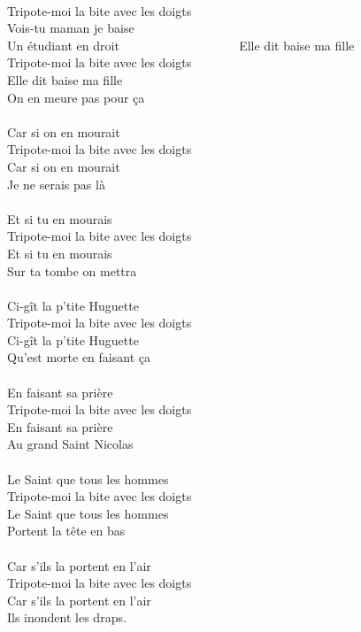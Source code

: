 \\Tripote-moi la bite avec les doigts
\\Vois-tu maman je baise
\\Un étudiant en droit ~~~~~~~~~~~~~~~~~~\bissimplemple
\breakpage
Elle dit baise ma fille
\\Tripote-moi la bite avec les doigts
\\Elle dit baise ma fille
\\On en meure pas pour ça ~~~~~~~~~~~~\bissimplemple
\\\\Car si on en mourait
\\Tripote-moi la bite avec les doigts
\\Car si on en mourait
\\Je ne serais pas là  ~~~~~~~~~~~~~~~~~~~~~~\bissimplemple
\\\\Et si tu en mourais
\\Tripote-moi la bite avec les doigts
\\Et si tu en mourais
\\Sur ta tombe on mettra  ~~~~~~~~~~~~~~\bissimplemple
\\\\Ci-gît la p'tite Huguette
\\Tripote-moi la bite avec les doigts
\\Ci-gît la p'tite Huguette
\\Qu'est morte en faisant ça  ~~~~~~~~~~\bissimplemple
\\\\En faisant sa prière
\\Tripote-moi la bite avec les doigts
\\En faisant sa prière
\\Au grand Saint Nicolas  ~~~~~~~~~~~~~~~\bissimplemple
\\\\Le Saint que tous les hommes
\\Tripote-moi la bite avec les doigts
\\Le Saint que tous les hommes
\\Portent la tête en bas  ~~~~~~~~~~~~~~~~~\bissimplemple
\\\\Car s'ils la portent en l'air
\\Tripote-moi la bite avec les doigts
\\Car s'ils la portent en l'air
\\Ils inondent les draps.  ~~~~~~~~~~~~~~~~\bissimplemple

\breakpage